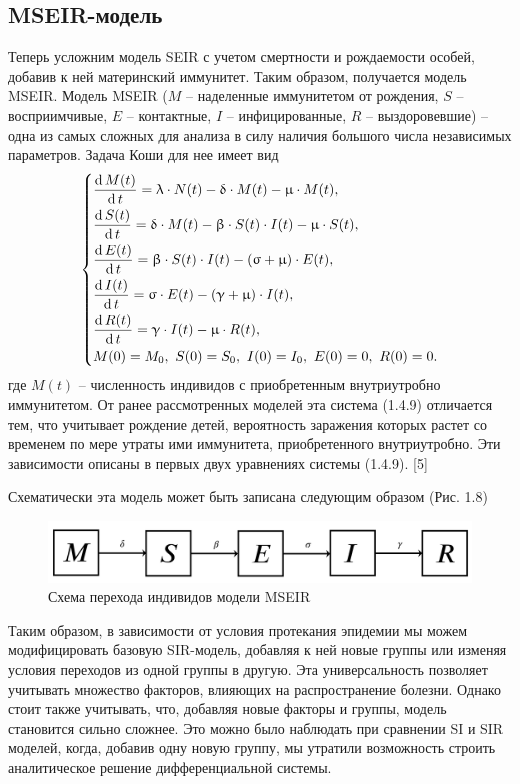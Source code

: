 \documentclass[a4paper, 14pt]{extreport}
\numberwithin{equation}{section}
\renewcommand{\beta}{\upbeta}
\renewcommand{\gamma}{\upgamma}
\renewcommand{\delta}{\updelta}
\renewcommand{\sigma}{\upsigma}
\renewcommand{\lambda}{\uplambda}
\renewcommand{\mu}{\upmu}
\renewcommand{\d}{\operatorname{d}}
\begin{document}
	\subsection{MSEIR-модель}
	Теперь усложним модель SEIR с учетом смертности и рождаемости особей, добавив к ней материнский иммунитет. Таким образом, получается модель MSEIR.
	Модель MSEIR ($M$ -- наделенные иммунитетом от рождения, $S$ -- восприимчивые, $E$ -- контактные, $I$ -- инфицированные, $R$ -- выздоровевшие) -- одна из самых сложных для анализа в силу наличия большого числа независимых параметров. Задача Коши для нее имеет вид
	\begin{equation}
		\begin{dcases}
		\dfrac {\d M(t)}{\d t} = \lambda \cdot N(t) - \delta\cdot M(t)-\mu\cdot M(t),\\
		\dfrac {\d S(t)}{\d t} = \delta \cdot M(t) -\beta\cdot S(t)\cdot I(t) - \mu \cdot S(t),\\
		\dfrac {\d E(t)}{\d t} = \beta \cdot S(t)\cdot I(t) - (\sigma + \mu)\cdot E(t),\\
		\dfrac{\d I(t)}{\d t} =\sigma \cdot E(t) - (\gamma + \mu)\cdot I(t),\\
		\dfrac{\d R(t)}{\d t} = \gamma\cdot I(t) - \mu \cdot R(t),\\
		M(0) = M_0,\ S(0) = S_0,\ I(0) = I_0,\ E(0) = 0,\ R(0) = 0.
		\end{dcases}
	\end{equation}
	где $M (t)$ -- численность индивидов с приобретенным внутриутробно иммунитетом. От ранее рассмотренных моделей эта система (1.4.9) отличается тем, что учитывает рождение детей, вероятность заражения которых растет со временем по мере утраты ими иммунитета, приобретенного внутриутробно. Эти зависимости описаны в первых двух уравнениях системы (1.4.9). [5]
	
	Схематически эта модель может быть записана следующим образом (Рис. 1.8)
	\begin{figure}[h]
		\centering
		\includegraphics[scale=0.3]{images/img10}
		\caption{Схема перехода индивидов модели MSEIR}
		\label{fig:img10}
	\end{figure}
	
	Таким образом, в зависимости от условия протекания эпидемии мы можем модифицировать базовую SIR-модель, добавляя к ней новые группы или изменяя условия переходов из одной группы в другую. Эта универсальность позволяет учитывать множество факторов, влияющих на распространение болезни. Однако стоит также учитывать, что, добавляя новые факторы и группы, модель становится сильно сложнее. Это можно было наблюдать при сравнении SI и SIR моделей, когда, добавив одну новую группу, мы утратили возможность строить аналитическое решение дифференциальной системы.
	
\end{document}
